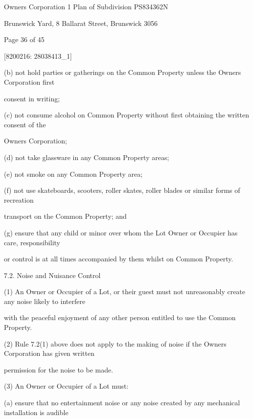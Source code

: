 \documentclass{article}
\begin{document}
{\fontsize{9}{1}Owners Corporation 1 Plan of Subdivision PS834362N }

{\fontsize{9}{1}Brunswick Yard, 8 Ballarat Street, Brunswick 3056 }


{\fontsize{9}{1}Page 36  of 45 }



{\fontsize{7.02}{1}[8200216: 28038413\_1] }

{\fontsize{9.962}{1}(b) not hold parties or gatherings on the Common Property unless the Owners Corporation first }

{\fontsize{10.02}{1}consent in writing; }

{\fontsize{9.962}{1}(c) not consume alcohol on Common Property without first obtaining the written consent of the }

{\fontsize{10.02}{1}Owners Corporation; }

{\fontsize{9.962}{1}(d) not take glassware in any Common Property areas; }

{\fontsize{9.962}{1}(e) not smoke on any Common Property area; }

{\fontsize{9.962}{1}(f) not use skateboards, scooters, roller skates, roller blades or similar forms of recreation }

{\fontsize{10.02}{1}transport on the Common Property; and }

{\fontsize{9.962}{1}(g) ensure that any child or minor over whom the Lot Owner or Occupier has care, responsibility }

{\fontsize{10.02}{1}or control is at all times accompanied by them whilst on Common Property. }

{\fontsize{9.99}{1}7.2. Noise and Nuisance Control }

{\fontsize{9.962}{1}(1) An Owner or Occupier of a Lot, or their guest must not unreasonably create any noise likely to interfere }

{\fontsize{10.02}{1}with the peaceful enjoyment of any other person entitled to use the Common Property. }

{\fontsize{9.962}{1}(2) Rule 7.2(1) above does not apply to the making of noise if the Owners Corporation has given written }

{\fontsize{10.02}{1}permission for the noise to be made. }

{\fontsize{9.962}{1}(3) An Owner or Occupier of a Lot must: }

{\fontsize{9.962}{1}(a) ensure that no entertainment noise or any noise created by any mechanical installation is audible }
\end{document}
